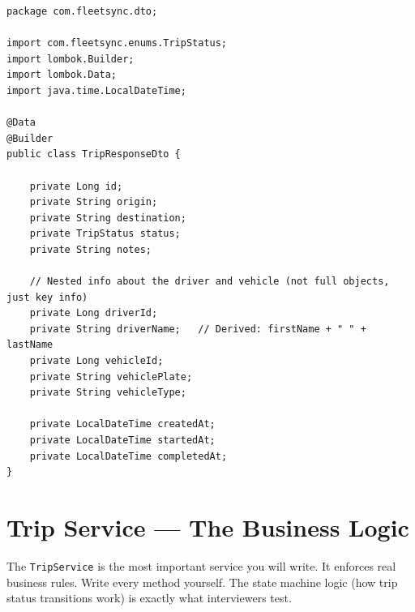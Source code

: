 \documentclass[12pt,a4paper]{report}
\newcommand{\code}[1]{\texttt{\textcolor{keywordblue}{#1}}}
\begin{document}
\begin{lstlisting}[caption=TripResponseDto.java]
package com.fleetsync.dto;

import com.fleetsync.enums.TripStatus;
import lombok.Builder;
import lombok.Data;
import java.time.LocalDateTime;

@Data
@Builder
public class TripResponseDto {

    private Long id;
    private String origin;
    private String destination;
    private TripStatus status;
    private String notes;

    // Nested info about the driver and vehicle (not full objects, just key info)
    private Long driverId;
    private String driverName;   // Derived: firstName + " " + lastName
    private Long vehicleId;
    private String vehiclePlate;
    private String vehicleType;

    private LocalDateTime createdAt;
    private LocalDateTime startedAt;
    private LocalDateTime completedAt;
}
\end{lstlisting}

\section{Trip Service --- The Business Logic}

\begin{tcolorbox}[handbox]
The \code{TripService} is the most important service you will write. It enforces real business rules. Write every method yourself. The state machine logic (how trip status transitions work) is exactly what interviewers test.
\end{tcolorbox}
\end{document}
